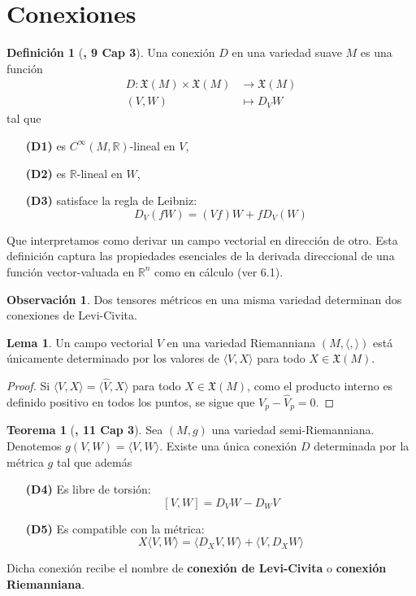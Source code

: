 \documentclass[spanish]{book}
\theoremstyle{definition}
\newtheorem*{defn}{Definición}
\newtheorem*{teo}{Teorema}
\newtheorem*{lema}{Lema}
\newtheorem*{obs}{Observación}
\newcommand{\R}{\mathbb{R}}
\newcommand{\X}{\mathfrak{X}}
\newcommand{\Cinf}{C^\infty}
\begin{document}
	\section{Conexiones}
	\begin{defn}[\cite{ONeill}\textbf{, 9 Cap 3}]
		Una conexión $D$ en una variedad suave $M$ es una función
	\begin{align*}
		D:\X(M)\times\X(M)&\to\X(M)\\
		(V,W)&\mapsto D_VW
	\end{align*}
	tal que
	\begin{enumerate}
		\item[\textbf{(D1)}] es $\Cinf(M,\R)$-lineal en $V$,
		\item[\textbf{(D2)}] es $\R$-lineal en $W$,
		\item[\textbf{(D3)}] satisface la regla de Leibniz:
		\[D_V(fW)=(Vf)W+fD_V(W)\]
	\end{enumerate}
	\end{defn}
	Que interpretamos como derivar un campo vectorial en dirección de otro. Esta definición captura las propiedades esenciales de la derivada direccional de una función vector-valuada en $\R^n$ como en cálculo (ver \cite{Loring-dif} 6.1).
	\begin{obs}
		Dos tensores métricos en una misma variedad determinan dos conexiones de Levi-Civita.
	\end{obs}
	\begin{lema}
		Un campo vectorial $V$ en una variedad Riemanniana $(M,\langle ,\rangle)$ está únicamente determinado por los valores de $\langle V,X\rangle$ para todo $X\in\X(M)$.
	\end{lema}
	\begin{proof}
		Si $\langle V,X\rangle=\langle \hat{V},X\rangle$ para todo $X\in\X(M)$, como el producto interno es definido positivo en todos los puntos, se sigue que $V_p-\hat{V}_p=0$. 
	\end{proof}
	\begin{teo}[\cite{ONeill}\textbf{, 11 Cap 3}]
		Sea $(M,g)$ una variedad semi-Riemanniana. Denotemos $g(V,W)=\langle V,W\rangle$. Existe una única conexión $D$ determinada por la métrica $g$ tal que además
		\begin{enumerate}
			\item[\textbf{(D4)}] Es libre de torsión:
			\[[V,W]=D_VW-D_WV\]
			\item[\textbf{(D5)}] Es compatible con la métrica:
			\[X\langle V,W\rangle=\langle D_XV,W\rangle+\langle V,D_XW\rangle\]
		\end{enumerate}
		Dicha conexión recibe el nombre de \textbf{conexión de Levi-Civita} o \textbf{conexión Riemanniana}.
	\end{teo}
\end{document}
